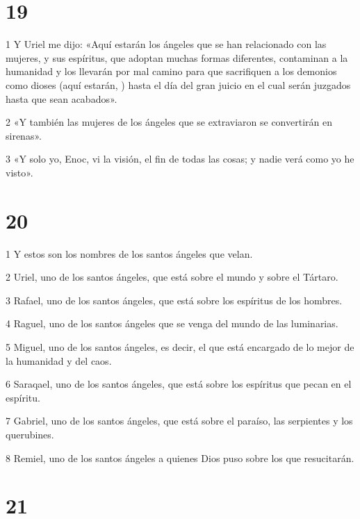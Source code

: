 \chapter{19}

\par 1 Y Uriel me dijo: «Aquí estarán los ángeles que se han relacionado con las mujeres, y sus espíritus, que adoptan muchas formas diferentes, contaminan a la humanidad y los llevarán por mal camino para que sacrifiquen a los demonios como dioses (aquí estarán, ) hasta el día del gran juicio en el cual serán juzgados hasta que sean acabados».
\par 2 «Y también las mujeres de los ángeles que se extraviaron se convertirán en sirenas».
\par 3 «Y solo yo, Enoc, vi la visión, el fin de todas las cosas; y nadie verá como yo he visto».

\chapter{20}

\par 1 Y estos son los nombres de los santos ángeles que velan.
\par 2 Uriel, uno de los santos ángeles, que está sobre el mundo y sobre el Tártaro.
\par 3 Rafael, uno de los santos ángeles, que está sobre los espíritus de los hombres.
\par 4 Raguel, uno de los santos ángeles que se venga del mundo de las luminarias.
\par 5 Miguel, uno de los santos ángeles, es decir, el que está encargado de lo mejor de la humanidad y del caos.
\par 6 Saraqael, uno de los santos ángeles, que está sobre los espíritus que pecan en el espíritu.
\par 7 Gabriel, uno de los santos ángeles, que está sobre el paraíso, las serpientes y los querubines.
\par 8 Remiel, uno de los santos ángeles a quienes Dios puso sobre los que resucitarán.

\chapter{21}

